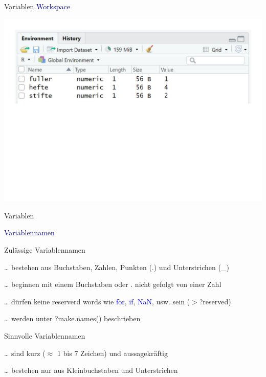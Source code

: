 \documentclass[
  8pt,
  ignorenonframetext,
]{beamer}
\begin{document}
\begin{frame}{Variablen}
\protect\hypertarget{variablen-4}{}
\textcolor{darkblue}{Workspace} \vfill

\begin{center}\includegraphics[width=0.9\linewidth]{2_Abbildungen/pds_2_workspace} \end{center}
\vfill
\end{frame}

\begin{frame}{Variablen}
\protect\hypertarget{variablen-5}{}

\textcolor{darkblue}{Variablennamen}

\vspace{2mm}

Zulässige Variablennamen

\ldots{} bestehen aus Buchstaben, Zahlen, Punkten (.) und Unterstrichen
(\_)

\ldots{} beginnen mit einem Buchstaben oder . nicht gefolgt von einer
Zahl

\ldots{} dürfen keine reserverd words wie \textcolor{blue}{for},
\textcolor{blue}{if}, \textcolor{blue}{NaN}, usw. sein (\(>\)?reserved)

\ldots{} werden unter ?make.names() beschrieben

Sinnvolle Variablennamen

\ldots{} sind kurz (\(\approx\) 1 bis 7 Zeichen) und aussagekräftig

\ldots{} bestehen nur aus Kleinbuchstaben und Unterstrichen
\end{frame}
\end{document}
